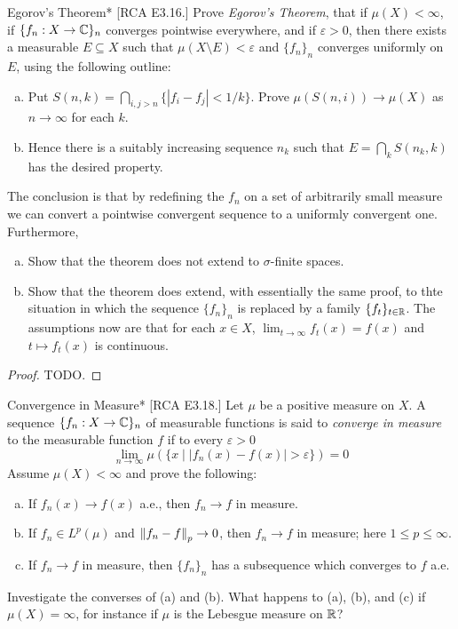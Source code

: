 \begin{problem}{Egorov's Theorem}*
    [RCA E3.16.] Prove \emph{Egorov's Theorem}, that if \(\mu(X) < \infty\), if \(\{f_n : X \to \mathbb{C}\}_n\) converges pointwise everywhere, and if \(\varepsilon > 0\), then there exists a measurable \(E \subseteq X\) such that \(\mu(X \setminus E) < \varepsilon\) and \(\{f_n\}_n\) converges uniformly on \(E\), using the following outline: 
    \begin{enumerate}[(a)]
        \itemsep0em
        \item Put \(S(n, k) = \bigcap_{i,j > n} \{|f_i - f_j| < 1/k\}\). Prove \(\mu(S(n, i)) \to \mu(X)\) as \(n \to \infty\) for each \(k\).
        \item Hence there is a suitably increasing sequence \(n_k\) such that \(E = \bigcap_k S(n_k, k)\) has the desired property.
    \end{enumerate}
    The conclusion is that by redefining the \(f_n\) on a set of arbitrarily small measure we can convert a pointwise convergent sequence to a uniformly convergent one. Furthermore, 
    \begin{enumerate}[(a)]
        \itemsep0em
        \item Show that the theorem does not extend to \(\sigma\)-finite spaces. 
        \item Show that the theorem does extend, with essentially the same proof, to thte situation in which the sequence \(\{f_n\}_n\) is replaced by a family \(\{f_t\}_{t \in \mathbb{R}}\). The assumptions now are that for each \(x \in X\), \(\lim_{t \to \infty} f_t(x) = f(x)\) and \(t \mapsto f_t(x)\) is continuous. 
    \end{enumerate}
\end{problem}

\begin{proof}
    TODO. 
\end{proof}


\begin{problem}{Convergence in Measure}*
    [RCA E3.18.] Let \(\mu\) be a positive measure on \(X\). A sequence \(\{f_n : X \to \mathbb{C}\}_n\) of measurable functions is said to \emph{converge in measure} to the measurable function \(f\) if to every \(\varepsilon > 0\)
    \[
        \lim_{n \to \infty} \mu( \{ x \mid |f_n(x) - f(x)| > \varepsilon \} ) = 0
    \]
    Assume \(\mu(X) < \infty\) and prove the following: 
    \begin{enumerate}[(a)]
        \itemsep0em
        \item If \(f_n(x) \to f(x)\) a.e., then \(f_n \to f\) in measure. 
        \item If \(f_n \in L^p(\mu)\) and \(\norm{f_n - f}_p \to 0\), then \(f_n \to f\) in measure; here \(1 \leq p \leq \infty\). 
        \item If \(f_n \to f\) in measure, then \(\{f_n\}_n\) has a subsequence which converges to \(f\) a.e. 
    \end{enumerate}

    Investigate the converses of (a) and (b). What happens to (a), (b), and (c) if \(\mu(X) = \infty\), for instance if \(\mu\) is the Lebesgue measure on \(\mathbb{R}\)? 
\end{problem}

